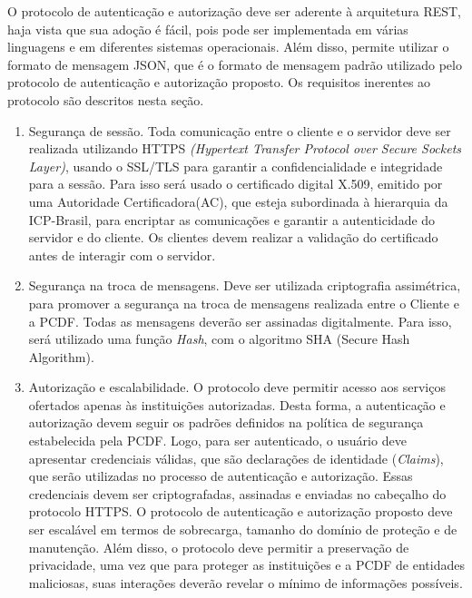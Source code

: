 O protocolo de autenticação e autorização deve ser aderente à arquitetura REST, haja vista que sua adoção é fácil, pois pode ser implementada em várias linguagens e em diferentes sistemas operacionais.  Além disso, permite utilizar o formato de mensagem JSON, que é o formato de mensagem padrão utilizado pelo protocolo de autenticação e autorização proposto. Os requisitos inerentes ao protocolo são descritos nesta seção.

\begin{enumerate}[RQ1]

\item Segurança de sessão. Toda comunicação entre o cliente e o servidor deve ser realizada utilizando HTTPS
\emph{(Hypertext Transfer Protocol over Secure Sockets Layer)}, usando o SSL/TLS para garantir a confidencialidade
e integridade para a sessão. Para isso será usado o certificado digital X.509, emitido por uma Autoridade Certificadora(AC), que esteja subordinada à hierarquia da ICP-Brasil, para encriptar as comunicações e garantir a autenticidade do servidor e do cliente. Os clientes devem realizar a validação do certificado antes de interagir com o servidor.

\item Segurança na troca de mensagens. Deve ser utilizada criptografia assimétrica, para promover a segurança na troca de mensagens realizada entre o Cliente e a PCDF. Todas as mensagens deverão ser assinadas digitalmente. Para isso, será utilizado uma função \emph{Hash}, com o algoritmo SHA (Secure Hash Algorithm).

\item Autorização e escalabilidade. O protocolo deve permitir acesso aos serviços ofertados apenas às instituições autorizadas. Desta forma, a autenticação e autorização devem seguir os padrões definidos na política de segurança estabelecida pela PCDF. Logo, para ser autenticado, o usuário deve apresentar credenciais válidas, que são declarações de identidade (\emph{Claims}), que serão utilizadas no processo de autenticação e autorização. Essas credenciais devem ser criptografadas, assinadas e enviadas no cabeçalho do protocolo HTTPS.
    O protocolo de autenticação e autorização proposto deve ser escalável em termos de sobrecarga, tamanho do domínio de proteção e de manutenção. Além disso, o protocolo deve permitir a preservação de privacidade, uma vez que para proteger as instituições e a PCDF de entidades maliciosas, suas interações deverão revelar o mínimo de informações possíveis.


\end{enumerate}
